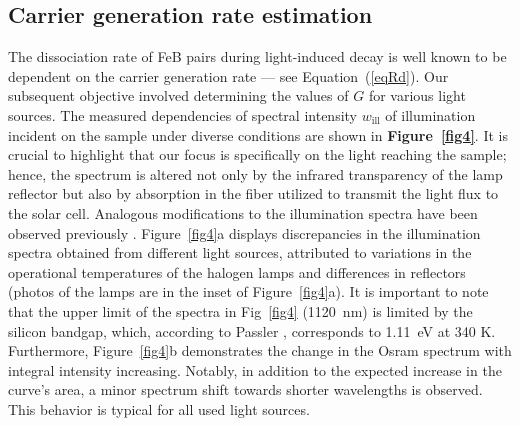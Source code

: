 \documentclass{WileyMSP-template}
\begin{document}
\subsection{Carrier generation rate estimation}\label{SecG}

The dissociation rate of FeB pairs during light-induced decay is well known
to be dependent on the carrier generation rate --- see Equation~(\ref{eqRd}).
Our subsequent objective involved determining the values of $G$ for various light sources.
The measured dependencies of spectral intensity $w_\mathrm{ill}$ of illumination incident on the sample under diverse conditions
are shown in \textbf{Figure~\ref{fig4}}.
It is crucial to highlight that our focus is specifically on the light reaching the sample;
hence, the spectrum is altered not only by the infrared transparency of the lamp reflector but also by absorption in the fiber
utilized to transmit the light flux to the solar cell.
Analogous modifications to the illumination spectra have been observed previously \cite{Libra2017}.
Figure~\ref{fig4}a displays discrepancies in the illumination spectra obtained from different light sources,
attributed to variations in the operational temperatures of the halogen lamps and differences in reflectors
(photos of the lamps are in the inset of Figure~\ref{fig4}a).
It is important to note that the upper limit of the spectra in Fig~\ref{fig4} (1120~nm)
is limited by the silicon bandgap, which, according to Passler \cite{Pasler}, corresponds to 1.11~eV at 340 K.
Furthermore, Figure~\ref{fig4}b demonstrates the change in the Osram spectrum with integral intensity increasing.
Notably, in addition to the expected increase in the curve's area, a minor spectrum shift towards shorter wavelengths is observed.
This behavior is typical for all used light sources.

\end{document}
